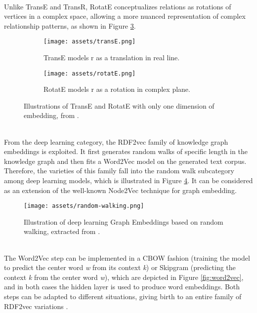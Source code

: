 \documentclass[11pt,titlepage,oneside,openany]{book}
\begin{document}
\\
Unlike TransE and TransR, RotatE \cite{sun_rotate_2019} conceptualizes relations as rotations of vertices in a complex space, allowing a more nuanced representation of complex relationship patterns, as shown in Figure \ref{fig:transe-rotate}.\\
\begin{figure}[h!]
    \centering
    \begin{subfigure}{0.4\textwidth}
        \texttt{[image: assets/transE.png]}
        \caption{TransE models r as a translation in real line.}
        \label{fig:transe}
    \end{subfigure}
    \hfill
    \begin{subfigure}{0.4\textwidth}
        \texttt{[image: assets/rotatE.png]}
        \caption{RotatE models r as a rotation in complex plane.}
        \label{fig:rotate}
    \end{subfigure}
    \caption{Illustrations of TransE and RotatE with only one dimension of embedding, from \cite{sun_rotate_2019}.}
    \label{fig:transe-rotate}
\end{figure}
\\
From the deep learning category, the RDF2vec \cite{ristoski_rdf2vec_2019} family of knowledge graph embeddings is exploited. It first generates random walks of specific length in the knowledge graph and then fits a Word2Vec \cite{mikolov_efficient_2013} model on the generated text corpus. Therefore, the varieties of this family fall into the random walk subcategory among deep learning models, which is illustrated in Figure \ref{fig:node2vec}. It can be considered as an extension of the well-known Node2Vec \cite{grover_node2vec_2016} technique for graph embedding. \\
\begin{figure}[h!]
    \centering
    \centerline{\texttt{[image: assets/random-walking.png]}}
    \caption{Illustration of deep learning Graph Embeddings based on random walking, extracted from \cite{xu_understanding_2020}.}
    \label{fig:node2vec}
\end{figure}
\\
The Word2Vec step can be implemented in a CBOW fashion (training the model to predict the center word \textit{w} from its context \textit{k}) or Skipgram (predicting the context \textit{k} from the center word \textit{w}), which are depicted in Figure \ref{fig:word2vec}, and in both cases the hidden layer is used to produce word embeddings. Both steps can be adapted to different situations, giving birth to an entire family of RDF2vec variations \cite{portisch_rdf2vec_2023}. \\
\end{document}
